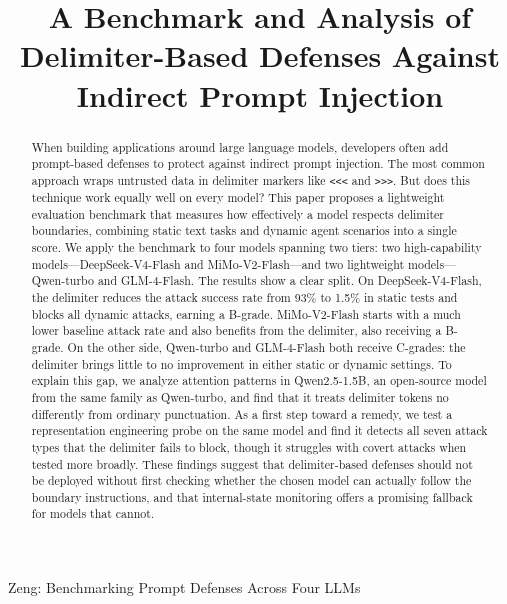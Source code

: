 \documentclass[journal]{IEEEtran}
\begin{document}

\title{A Benchmark and Analysis of Delimiter-Based Defenses Against Indirect Prompt Injection}


\author{
}

%
{Zeng: Benchmarking Prompt Defenses Across Four LLMs}

\maketitle

\begin{abstract}
When building applications around large language models, developers often add prompt-based defenses to protect against indirect prompt injection. The most common approach wraps untrusted data in delimiter markers like \texttt{<<<} and \texttt{>>>}. But does this technique work equally well on every model? This paper proposes a lightweight evaluation benchmark that measures how effectively a model respects delimiter boundaries, combining static text tasks and dynamic agent scenarios into a single score. We apply the benchmark to four models spanning two tiers: two high-capability models---DeepSeek-V4-Flash and MiMo-V2-Flash---and two lightweight models---Qwen-turbo and GLM-4-Flash. The results show a clear split. On DeepSeek-V4-Flash, the delimiter reduces the attack success rate from 93\% to 1.5\% in static tests and blocks all dynamic attacks, earning a B-grade. MiMo-V2-Flash starts with a much lower baseline attack rate and also benefits from the delimiter, also receiving a B-grade. On the other side, Qwen-turbo and GLM-4-Flash both receive C-grades: the delimiter brings little to no improvement in either static or dynamic settings. To explain this gap, we analyze attention patterns in Qwen2.5-1.5B, an open-source model from the same family as Qwen-turbo, and find that it treats delimiter tokens no differently from ordinary punctuation. As a first step toward a remedy, we test a representation engineering probe on the same model and find it detects all seven attack types that the delimiter fails to block, though it struggles with covert attacks when tested more broadly. These findings suggest that delimiter-based defenses should not be deployed without first checking whether the chosen model can actually follow the boundary instructions, and that internal-state monitoring offers a promising fallback for models that cannot.
\end{abstract}
\end{document}
